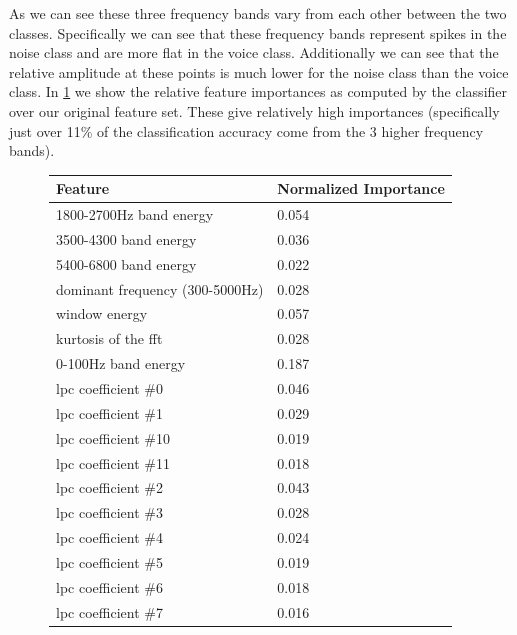 \documentclass[ %
                    author={Sam Phippen},
                supervisor={Dr. Rafal Bogacz},
                     title={Real time voice activity detectors in noisy personal computing environments},
                  subtitle={},
                    degree={MEng},
                      year={2012} ]{thesis}
\begin{document}
As we can see these three frequency bands vary from each other between the two
classes. Specifically we can see that these frequency bands represent spikes in
the noise class and are more flat in the voice class. Additionally we can see
that the relative amplitude at these points is much lower for the noise
class than the voice class. In \ref{table:importances} we show the relative
feature importances as computed by the classifier over our original feature
set. These give relatively high importances (specifically just over 11\% of the
classification accuracy come from the 3 higher frequency bands).

\begin{figure}
    \label{table:importances}
    \begin{tabular}{| l | l |}
    \hline
        Feature                                    & Normalized Importance \\ \hline
        1800-2700Hz band energy                    & 0.054 \\
        3500-4300 band energy                      & 0.036 \\
        5400-6800 band energy                      & 0.022 \\
        dominant frequency (300-5000Hz)            & 0.028 \\
        window energy                              & 0.057 \\
        kurtosis of the fft                        & 0.028 \\
        0-100Hz band energy                        & 0.187 \\
        lpc coefficient \#0                        & 0.046 \\
        lpc coefficient \#1                        & 0.029 \\
        lpc coefficient \#10                       & 0.019 \\
        lpc coefficient \#11                       & 0.018 \\
        lpc coefficient \#2                        & 0.043 \\
        lpc coefficient \#3                        & 0.028 \\
        lpc coefficient \#4                        & 0.024 \\
        lpc coefficient \#5                        & 0.019 \\
        lpc coefficient \#6                        & 0.018 \\
        lpc coefficient \#7                        & 0.016 \\

\end{tabular}
\end{figure}
\end{document}
